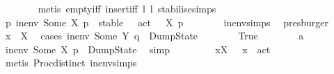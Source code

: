 \begin{isabellebody}
\ \ \ \ \ \ \isamarkupfalse%
\ {\isacharparenleft}{\kern0pt}metis\ empty{\isacharunderscore}{\kern0pt}iff\ insert{\isacharunderscore}{\kern0pt}iff\ l{}\ l{}\ stabilise{\isachardot}{\kern0pt}simps{\isacharparenleft}{\kern0pt}{}{\isacharparenright}{\kern0pt}{\isacharparenright}{\kern0pt}\isanewline
\ \ \ \ \isamarkupfalse%
\ p{}{\isacharcolon}{\kern0pt}\ {\isacartoucheopen}in{\isacharunderscore}{\kern0pt}env\ {\isacharparenleft}{\kern0pt}Some\ X{\isacharparenright}{\kern0pt}\ p\ {\isacharequal}{\kern0pt}\ stable\ {\isacharbraceleft}{\kern0pt}{\isasymalpha}\ {\isachardot}{\kern0pt}\ act\ {\isasymalpha}\ {\isasymin}\ X{\isacharbraceright}{\kern0pt}\ p{\isacartoucheclose}\isanewline
\ \ \ \ \ \ \isamarkupfalse%
\ in{\isacharunderscore}{\kern0pt}env{\isachardot}{\kern0pt}simps{\isacharparenleft}{\kern0pt}{}{\isacharparenright}{\kern0pt}\ \isamarkupfalse%
\ presburger\isanewline
\isanewline
\ \ \ \ \isamarkupfalse%
\ {\isacartoucheopen}x\ {\isasymin}\ X{\isacartoucheclose}\ \isamarkupfalse%
\ {\isacharparenleft}{\kern0pt}cases\ {\isacartoucheopen}in{\isacharunderscore}{\kern0pt}env\ {\isacharparenleft}{\kern0pt}Some\ Y{\isacharparenright}{\kern0pt}\ q\ {\isacharequal}{\kern0pt}\ DumpState{\isacartoucheclose}{\isacharparenright}{\kern0pt}\isanewline
\ \ \ \ \ \ \isamarkupfalse%
\ True\isanewline
\ \ \ \ \ \ \isamarkupfalse%
\ a{}\ \isamarkupfalse%
\ {\isacartoucheopen}in{\isacharunderscore}{\kern0pt}env\ {\isacharparenleft}{\kern0pt}Some\ X{\isacharparenright}{\kern0pt}\ p\ {\isacharequal}{\kern0pt}\ DumpState{\isacartoucheclose}\ \isamarkupfalse%
\ simp\isanewline
\ \ \ \ \ \ \isamarkupfalse%
\ {\isacartoucheopen}{\isasymexists}\ x{\isasymin}X{\isachardot}{\kern0pt}\ {\isacharparenleft}{\kern0pt}{\isasymnexists}\ {\isasymalpha}{\isachardot}{\kern0pt}\ x\ {\isacharequal}{\kern0pt}\ act\ {\isasymalpha}{\isacharparenright}{\kern0pt}{\isacartoucheclose}\isanewline
\ \ \ \ \ \ \ \ \isamarkupfalse%
\ {\isacharparenleft}{\kern0pt}metis\ Proc{\isacharunderscore}{\kern0pt}{\isasymtheta}{\isachardot}{\kern0pt}distinct{\isacharparenleft}{\kern0pt}{}{\isacharparenright}{\kern0pt}\ in{\isacharunderscore}{\kern0pt}env{\isachardot}{\kern0pt}simps{\isacharparenleft}{\kern0pt}{}{\isacharparenright}{\kern0pt}{\isacharparenright}{\kern0pt}\isanewline
\ \ \ \ \ \ \isamarkupfalse%

\end{isabellebody}
